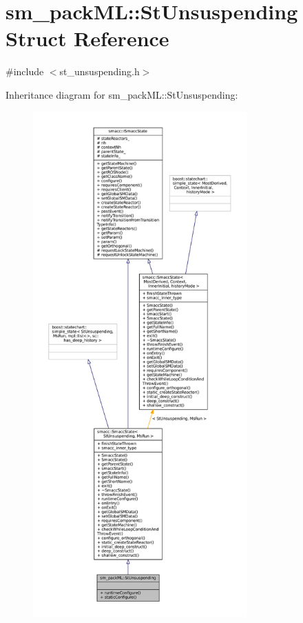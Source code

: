 \hypertarget{structsm__packML_1_1StUnsuspending}{}\section{sm\+\_\+pack\+ML\+:\+:St\+Unsuspending Struct Reference}
\label{structsm__packML_1_1StUnsuspending}


{\ttfamily \#include $<$st\+\_\+unsuspending.\+h$>$}



Inheritance diagram for sm\+\_\+pack\+ML\+:\+:St\+Unsuspending\+:
\nopagebreak
\begin{figure}[H]
\begin{center}
\leavevmode
\includegraphics[height=550pt]{structsm__packML_1_1StUnsuspending__inherit__graph}
\end{center}
\end{figure}


